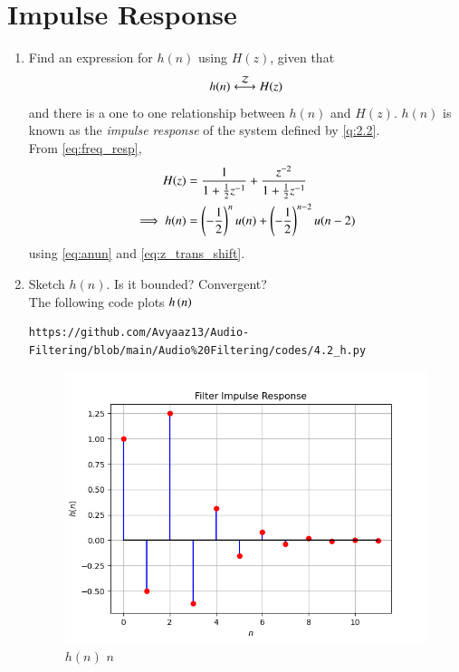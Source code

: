 \documentclass[journal,12pt,twocolumn]{IEEEtran}
\theoremstyle{remark}
\renewcommand\thesection{\arabic{section}}
\numberwithin{equation}{subsection}
\begin{document}
\section{Impulse Response}
\begin{enumerate}[label=\thesection.\arabic*]
\item \label{prob:impulse_resp}
Find an expression for $h(n)$ using $H(z)$, given that 
\begin{equation}
\label{eq:impulse_resp}
h(n) \system{Z} H(z)
\end{equation}
and there is a one to one relationship between $h(n)$ and $H(z)$. $h(n)$ is known as the {\em impulse response} of the
system defined by \eqref{q:2.2}.
\\
\solution From \eqref{eq:freq_resp},
\begin{align}
H(z) &= \frac{1}{1 + \frac{1}{2}z^{-1}} + \frac{ z^{-2}}{1 + \frac{1}{2}z^{-1}}
\\
\implies h(n) &= \left(-\frac{1}{2}\right)^{n}u(n) + \left(-\frac{1}{2}\right)^{n-2}u(n-2)
\end{align}
using \eqref{eq:anun} and \eqref{eq:z_trans_shift}.
\item Sketch $h(n)$. Is it bounded? Convergent? 
\\
\solution The following code plots $h\left(n\right)$ 
\begin{lstlisting}
https://github.com/Avyaaz13/Audio-Filtering/blob/main/Audio%20Filtering/codes/4.2_h.py
\end{lstlisting}
\begin{figure}[!ht]
\centering
\includegraphics[width=\columnwidth]{figs/hn}
\caption{$h(n)$  $n$}
\label{fig:hn}
\end{figure}


\end{enumerate}
\end{document}
